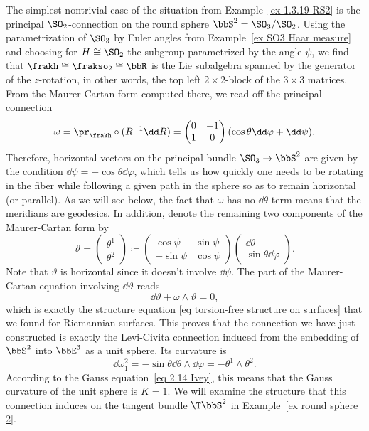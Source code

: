 \begin{example}\label{ex round sphere 1}
    The simplest nontrivial case of the situation from Example~\ref{ex 1.3.19 RS2} is the principal $\SO_2$-connection on the round sphere $\bbS^2=\SO_3\slash \SO_2$. Using the parametrization of $\SO_3$ by Euler angles from Example~\ref{ex SO3 Haar measure} and choosing for $H\cong \SO_2$ the subgroup parametrized by the angle $\psi$, we find that $\frakh\cong \frakso_2\cong \bbR$ is the Lie subalgebra spanned by the generator of the $z$-rotation, in other words, the top left $2\times 2$-block of the $3\times 3$ matrices. From the Maurer-Cartan form computed there, we read off the principal connection
    \[\omega=\pr_\frakh\circ(R^{-1}\dd R)=\begin{pmatrix}
        0 & -1\\
        1 & 0
    \end{pmatrix}(\cos\theta\dd\varphi+\dd\psi).\]
    Therefore, horizontal vectors on the principal bundle $\SO_3\to \bbS^2$ are given by the condition $\dd\psi=-\cos\theta\dd\varphi$, which tells us how quickly one needs to be rotating in the fiber while following a given path in the sphere so as to remain horizontal (or parallel). As we will see below, the fact that $\omega$ has no $\dd\theta$ term means that the meridians are geodesics. In addition, denote the remaining two components of the Maurer-Cartan form by
    \[\vartheta=\begin{pmatrix}\theta^1\\\theta^2\end{pmatrix}\coloneqq \begin{pmatrix}
        \cos\psi & \sin\psi \\
        -\sin\psi & \cos\psi 
    \end{pmatrix}
    \begin{pmatrix}
        \dd\theta \\ \sin\theta\dd\varphi
    \end{pmatrix}.
    \]
    Note that $\vartheta$ is horizontal since it doesn't involve $\dd\psi$.
    The part of the Maurer-Cartan equation involving $\dd\vartheta$ reads 
    \[\dd\vartheta+\omega\wedge\vartheta=0,\]
    which is exactly the structure equation \eqref{eq torsion-free structure on surfaces} that we found for Riemannian surfaces. This proves that the connection we have just constructed is exactly the Levi-Civita connection induced from the embedding of $\bbS^2$ into $\bbE^3$ as a unit sphere. Its curvature is 
    \[\dd\omega^2_1=-\sin\theta \dd\theta\wedge\dd\varphi=-\theta^1\wedge\theta^2.\]
    According to the Gauss equation~\ref{eq 2.14 Ivey}, this means that the Gauss curvature of the unit sphere is $K=1$. We will examine the structure that this connection induces on the tangent bundle $\T\bbS^2$ in Example~\ref{ex round sphere 2}.
\end{example}

